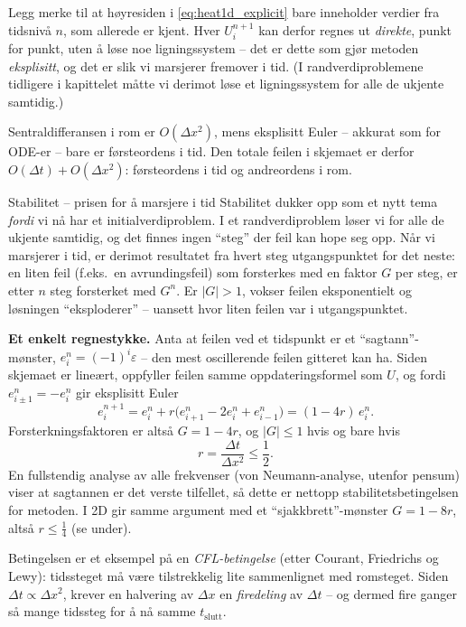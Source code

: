 \begin{itemize}
Legg merke til at høyresiden i \eqref{eq:heat1d_explicit} bare inneholder verdier fra tidsnivå $n$, som allerede er kjent. Hver $U_i^{n+1}$ kan derfor regnes ut \emph{direkte}, punkt for punkt, uten å løse noe ligningssystem -- det er dette som gjør metoden \emph{eksplisitt}, og det er slik vi marsjerer fremover i tid. (I randverdiproblemene tidligere i kapittelet måtte vi derimot løse et ligningssystem for alle de ukjente samtidig.)

Sentraldifferansen i rom er $O(\Delta x^2)$, mens eksplisitt Euler -- akkurat som for ODE-er -- bare er førsteordens i tid. Den totale feilen i skjemaet er derfor $O(\Delta t)+O(\Delta x^2)$: førsteordens i tid og andreordens i rom.
\end{itemize}

\begin{rem}{Stabilitet -- prisen for å marsjere i tid}\label{oppsum:stabilitet}
Stabilitet dukker opp som et nytt tema \emph{fordi} vi nå har et initialverdiproblem. I et randverdiproblem løser vi for alle de ukjente samtidig, og det finnes ingen ``steg'' der feil kan hope seg opp. Når vi marsjerer i tid, er derimot resultatet fra hvert steg utgangspunktet for det neste: en liten feil (f.eks.\ en avrundingsfeil) som forsterkes med en faktor $G$ per steg, er etter $n$ steg forsterket med $G^n$. Er $|G|>1$, vokser feilen eksponentielt og løsningen ``eksploderer'' -- uansett hvor liten feilen var i utgangspunktet.

\medskip
\textbf{Et enkelt regnestykke.} Anta at feilen ved et tidspunkt er et ``sagtann''-mønster, $e_i^n=(-1)^i\varepsilon$ -- den mest oscillerende feilen gitteret kan ha. Siden skjemaet er lineært, oppfyller feilen samme oppdateringsformel som $U$, og fordi $e_{i\pm1}^n=-e_i^n$ gir eksplisitt Euler
\[
e_i^{n+1} = e_i^n + r\big(e_{i+1}^n-2e_i^n+e_{i-1}^n\big) = (1-4r)\,e_i^n .
\]
Forsterkningsfaktoren er altså $G=1-4r$, og $|G|\le 1$ hvis og bare hvis
\[
r=\frac{\Delta t}{\Delta x^2}\le \frac12 .
\]
En fullstendig analyse av alle frekvenser (von Neumann-analyse, utenfor pensum) viser at sagtannen er det verste tilfellet, så dette er nettopp stabilitetsbetingelsen for metoden. I 2D gir samme argument med et ``sjakkbrett''-mønster $G=1-8r$, altså $r\le\frac14$ (se under).

\medskip
Betingelsen er et eksempel på en \emph{CFL-betingelse} (etter Courant, Friedrichs og Lewy): tidssteget må være tilstrekkelig lite sammenlignet med romsteget. Siden $\Delta t\propto\Delta x^2$, krever en halvering av $\Delta x$ en \emph{firedeling} av $\Delta t$ -- og dermed fire ganger så mange tidssteg for å nå samme $t_{\text{slutt}}$.
\end{rem}

